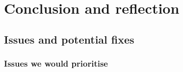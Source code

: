 \chapter{Conclusion and reflection}
\label{Conclusion}

\section{Issues and potential fixes}
\label{Conclusion_Issues}

\subsection{Issues we would prioritise}
\label{Conclusion_Issues_Prioritise}